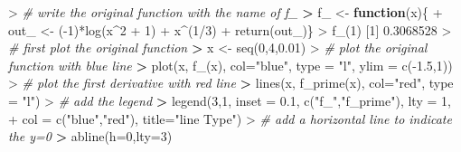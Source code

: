 \documentclass[
]{article}
\newenvironment{Shaded}{\begin{snugshade}}{\end{snugshade}}
\newcommand{\AttributeTok}[1]{\textcolor[rgb]{0.77,0.63,0.00}{#1}}
\newcommand{\CommentTok}[1]{\textcolor[rgb]{0.56,0.35,0.01}{\textit{#1}}}
\newcommand{\ControlFlowTok}[1]{\textcolor[rgb]{0.13,0.29,0.53}{\textbf{#1}}}
\newcommand{\DecValTok}[1]{\textcolor[rgb]{0.00,0.00,0.81}{#1}}
\newcommand{\ErrorTok}[1]{\textcolor[rgb]{0.64,0.00,0.00}{\textbf{#1}}}
\newcommand{\FloatTok}[1]{\textcolor[rgb]{0.00,0.00,0.81}{#1}}
\newcommand{\FunctionTok}[1]{\textcolor[rgb]{0.00,0.00,0.00}{#1}}
\newcommand{\NormalTok}[1]{#1}
\newcommand{\OtherTok}[1]{\textcolor[rgb]{0.56,0.35,0.01}{#1}}
\newcommand{\SpecialCharTok}[1]{\textcolor[rgb]{0.00,0.00,0.00}{#1}}
\newcommand{\StringTok}[1]{\textcolor[rgb]{0.31,0.60,0.02}{#1}}
\begin{document}
\begin{Shaded}
\begin{Highlighting}[]
\SpecialCharTok{\textgreater{}} \CommentTok{\# write the original function with the name of f\_}
\ErrorTok{\textgreater{}}\NormalTok{ f\_ }\OtherTok{\textless{}{-}} \ControlFlowTok{function}\NormalTok{(x)\{}
\SpecialCharTok{+}\NormalTok{   out\_ }\OtherTok{\textless{}{-}}\NormalTok{ (}\SpecialCharTok{{-}}\DecValTok{1}\NormalTok{)}\SpecialCharTok{*}\FunctionTok{log}\NormalTok{(x}\SpecialCharTok{\^{}}\DecValTok{2} \SpecialCharTok{+} \DecValTok{1}\NormalTok{) }\SpecialCharTok{+}\NormalTok{ x}\SpecialCharTok{\^{}}\NormalTok{(}\DecValTok{1}\SpecialCharTok{/}\DecValTok{3}\NormalTok{)}
\SpecialCharTok{+}   \FunctionTok{return}\NormalTok{(out\_)\}}
\SpecialCharTok{\textgreater{}} \FunctionTok{f\_}\NormalTok{(}\DecValTok{1}\NormalTok{)}
\NormalTok{[}\DecValTok{1}\NormalTok{] }\FloatTok{0.3068528}
\SpecialCharTok{\textgreater{}} \CommentTok{\# first plot the original function}
\ErrorTok{\textgreater{}}\NormalTok{ x }\OtherTok{\textless{}{-}} \FunctionTok{seq}\NormalTok{(}\DecValTok{0}\NormalTok{,}\DecValTok{4}\NormalTok{,}\FloatTok{0.01}\NormalTok{)}
\SpecialCharTok{\textgreater{}} \CommentTok{\# plot the original function with blue line}
\ErrorTok{\textgreater{}} \FunctionTok{plot}\NormalTok{(x, }\FunctionTok{f\_}\NormalTok{(x), }\AttributeTok{col=}\StringTok{"blue"}\NormalTok{, }\AttributeTok{type =} \StringTok{"l"}\NormalTok{, }\AttributeTok{ylim =} \FunctionTok{c}\NormalTok{(}\SpecialCharTok{{-}}\FloatTok{1.5}\NormalTok{,}\DecValTok{1}\NormalTok{))}
\SpecialCharTok{\textgreater{}} \CommentTok{\# plot the first derivative with red line}
\ErrorTok{\textgreater{}} \FunctionTok{lines}\NormalTok{(x, }\FunctionTok{f\_prime}\NormalTok{(x), }\AttributeTok{col=}\StringTok{"red"}\NormalTok{, }\AttributeTok{type =} \StringTok{"l"}\NormalTok{)}
\SpecialCharTok{\textgreater{}} \CommentTok{\# add the legend}
\ErrorTok{\textgreater{}} \FunctionTok{legend}\NormalTok{(}\DecValTok{3}\NormalTok{,}\DecValTok{1}\NormalTok{, }\AttributeTok{inset =} \FloatTok{0.1}\NormalTok{, }\FunctionTok{c}\NormalTok{(}\StringTok{"f\_"}\NormalTok{,}\StringTok{"f\_prime"}\NormalTok{), }\AttributeTok{lty =} \DecValTok{1}\NormalTok{, }
\SpecialCharTok{+}        \AttributeTok{col =} \FunctionTok{c}\NormalTok{(}\StringTok{"blue"}\NormalTok{,}\StringTok{"red"}\NormalTok{), }\AttributeTok{title=}\StringTok{"line Type"}\NormalTok{)}
\SpecialCharTok{\textgreater{}} \CommentTok{\# add a horizontal line to indicate the y=0}
\ErrorTok{\textgreater{}} \FunctionTok{abline}\NormalTok{(}\AttributeTok{h=}\DecValTok{0}\NormalTok{,}\AttributeTok{lty=}\DecValTok{3}\NormalTok{)}
\end{Highlighting}
\end{Shaded}
\end{document}
